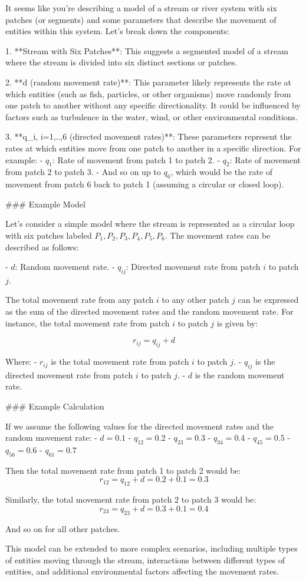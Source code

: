 It seems like you're describing a model of a stream or river system with six patches (or segments) and some parameters that describe the movement of entities within this system. Let's break down the components:

1. **Stream with Six Patches**: This suggests a segmented model of a stream where the stream is divided into six distinct sections or patches.

2. **d (random movement rate)**: This parameter likely represents the rate at which entities (such as fish, particles, or other organisms) move randomly from one patch to another without any specific directionality. It could be influenced by factors such as turbulence in the water, wind, or other environmental conditions.

3. **q_i, i=1,..,6 (directed movement rates)**: These parameters represent the rates at which entities move from one patch to another in a specific direction. For example:
   - \( q_1 \): Rate of movement from patch 1 to patch 2.
   - \( q_2 \): Rate of movement from patch 2 to patch 3.
   - And so on up to \( q_6 \), which would be the rate of movement from patch 6 back to patch 1 (assuming a circular or closed loop).

### Example Model

Let's consider a simple model where the stream is represented as a circular loop with six patches labeled \( P_1, P_2, P_3, P_4, P_5, P_6 \). The movement rates can be described as follows:

- \( d \): Random movement rate.
- \( q_{ij} \): Directed movement rate from patch \( i \) to patch \( j \).

The total movement rate from any patch \( i \) to any other patch \( j \) can be expressed as the sum of the directed movement rates and the random movement rate. For instance, the total movement rate from patch \( i \) to patch \( j \) is given by:

\[ r_{ij} = q_{ij} + d \]

Where:
- \( r_{ij} \) is the total movement rate from patch \( i \) to patch \( j \).
- \( q_{ij} \) is the directed movement rate from patch \( i \) to patch \( j \).
- \( d \) is the random movement rate.

### Example Calculation

If we assume the following values for the directed movement rates and the random movement rate:
- \( d = 0.1 \)
- \( q_{12} = 0.2 \)
- \( q_{23} = 0.3 \)
- \( q_{34} = 0.4 \)
- \( q_{45} = 0.5 \)
- \( q_{56} = 0.6 \)
- \( q_{61} = 0.7 \)

Then the total movement rate from patch 1 to patch 2 would be:
\[ r_{12} = q_{12} + d = 0.2 + 0.1 = 0.3 \]

Similarly, the total movement rate from patch 2 to patch 3 would be:
\[ r_{23} = q_{23} + d = 0.3 + 0.1 = 0.4 \]

And so on for all other patches.

This model can be extended to more complex scenarios, including multiple types of entities moving through the stream, interactions between different types of entities, and additional environmental factors affecting the movement rates.